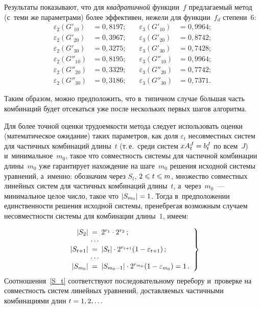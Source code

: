 \begin{multicols}{2}
Результаты показывают, что для \textit{квадратичной} функции~$f$ предлагаемый 
метод (с~теми же параметрами) более эффективен, нежели для функции~$f_d$ 
степени~$6$:
\begin{alignat*}{2}
    \varepsilon_2\left(G'_{10}\right)&= 0{,}8197; &\quad \varepsilon_3\left(G'_{10}\right)&= 0{,}9964;  \\
    \varepsilon_2\left(G'_{20}\right)&= 0{,}3967; &\quad \varepsilon_3\left(G'_{20}\right)&= 0{,}8742;  \\
    \varepsilon_2\left(G'_{30}\right)&= 0{,}3275; &\quad \varepsilon_3\left(G'_{30}\right)&= 0{,}7428;  \\
    \varepsilon_2\left(G''_{10}\right)&= 0{,}8195; &\quad \varepsilon_3\left(G''_{10}\right)&= 0{,}9964; \\
    \varepsilon_2\left(G''_{20}\right)&= 0{,}3329; &\quad \varepsilon_3\left(G''_{20}\right)&= 0{,}7742; \\
    \varepsilon_2\left(G''_{30}\right)&= 0{,}3186; &\quad \varepsilon_3\left(G''_{30}\right)&= 0{,}7371. 
\end{alignat*}



Таким образом, можно предположить, что в~типичном случае б$\acute{\mbox{о}}$льшая часть 
комбинаций будет отсекаться уже после нескольких первых шагов алгоритма.

Для более точной оценки трудоемкости метода следует использовать оценки 
(математическое ожидание) таких параметров, как доля $\varepsilon_t$ несовместных 
систем для час\-тич\-ных комбинаций длины~$t$ (т.\,е.\ среди систем 
$xA^{J}_t\hm=b^{J}_t$ по всем~$J$) и~минимальное~$m_0$, такое что совместность 
системы для частичной комбинации длины~$m_0$ уже гарантирует нахождение на 
шаге~$m_0$ решения исходной системы уравнений, а~именно: обозначим через $S_t$, $2\hm\leqslant t\hm\leqslant m$, множество совместных линейных 
систем для частичных комбинаций длины~$t$, 
а~через~$m_0$~--- минимальное целое число, такое что $|S_{m_0}|\hm=1$.
Тогда в~предположении единственности решения исходной системы, пренебрегая 
возможным случаем несовместности системы для комбинации длины~$1$, имеем:


\noindent
\begin{equation}
\label{S_t}
\left.
 \begin{array}{r@{\ }c@{\ }l}
  |S_2|&=&2^{r_1}\cdot 2^{r_2}\,;\\
  &\cdots\\
  |S_{t+1}|&=&|S_t|\cdot 2^{r_{t+1}}(1-\varepsilon_{t+1})\,;\\
  &\cdots\\
  |S_{m_0}|&=&|S_{m_0-1}|\cdot 2^{r_{m_0}}(1-\varepsilon_{m_0})=1\,.
 \end{array}
 \right\}
\end{equation}
Соотношения~\eqref{S_t} соответствуют последовательному перебору и~проверке на 
совместность
систем линейных уравнений, доставляемых частичными комбинациями длин 
$t\hm=1,2,\ldots$


\end{multicols}

